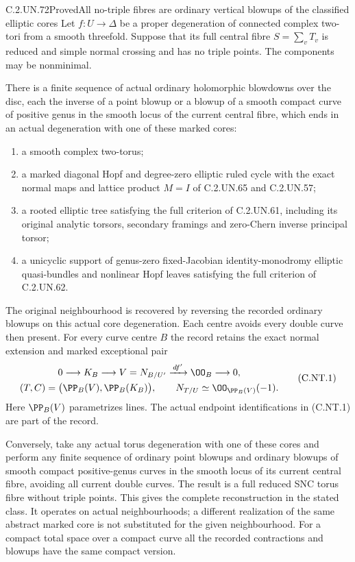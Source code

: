 \begin{statement}{C.2.UN.72}{Proved}{All no-triple fibres are ordinary vertical blowups of the classified elliptic cores}
Let $f:U\to\Delta$ be a proper degeneration of connected complex
two-tori from a smooth threefold. Suppose that its full central
fibre $S=\sum_vT_v$ is reduced and simple normal crossing and
has no triple points. The components may be nonminimal.

There is a finite sequence of actual ordinary holomorphic
blowdowns over the disc, each the inverse of a point blowup
or a blowup of a smooth compact curve of positive genus in
the smooth locus of the current central fibre, which ends
in an actual degeneration with one of these marked cores:
\begin{enumerate}
\item a smooth complex two-torus;
\item a marked diagonal Hopf and degree-zero elliptic ruled
cycle with the exact normal maps and lattice product $M=I$
of C.2.UN.65 and C.2.UN.57;
\item a rooted elliptic tree satisfying the full criterion
of C.2.UN.61, including its original analytic torsors,
secondary framings and zero-Chern inverse principal torsor;
\item a unicyclic support of genus-zero fixed-Jacobian
identity-monodromy elliptic quasi-bundles and nonlinear
Hopf leaves satisfying the full criterion of C.2.UN.62.
\end{enumerate}
The original neighbourhood is recovered by reversing the
recorded ordinary blowups on this actual core degeneration.
Each centre avoids every double curve then present.
For every curve centre $B$ the record retains the exact
normal extension and marked exceptional pair
\[
 \begin{gathered}
 0\longrightarrow K_B\longrightarrow V=N_{B/U'}
                 \xrightarrow{\,df'\,}\OO_B\longrightarrow0,\\
 (T,C)=\bigl(\PP_B(V),\PP_B(K_B)\bigr),\qquad
 N_{T/U}\simeq\OO_{\PP_B(V)}(-1).
 \end{gathered}
\tag{C.NT.1}
\]
Here $\PP_B(V)$ parametrizes lines. The actual endpoint
identifications in (C.NT.1) are part of the record.

Conversely, take any actual torus degeneration with one of
these cores and perform any finite sequence of ordinary
point blowups and ordinary blowups of smooth compact
positive-genus curves in the smooth locus of its current
central fibre, avoiding all current double curves. The
result is a full reduced SNC torus fibre without triple
points. This gives the complete reconstruction in the
stated class. It operates on actual neighbourhoods; a
different realization of the same abstract marked core
is not substituted for the given neighbourhood.
For a compact total space over a compact curve all the
recorded contractions and blowups have the same compact
version.


\end{statement}
